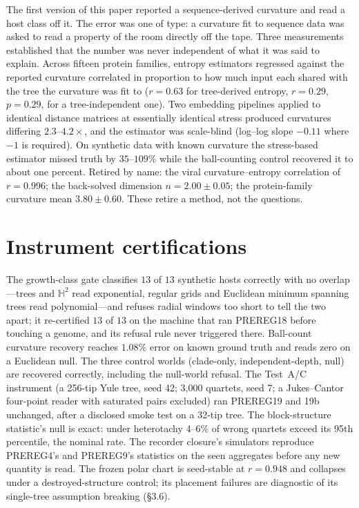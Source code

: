\documentclass[11pt]{article}
\newcommand{\Htwo}{\mathbb{H}^2}
\begin{document}
The first version of this paper reported a sequence-derived curvature and read a host class off it. The error was one of type: a curvature fit to sequence data was asked to read a property of the room directly off the tape. Three measurements established that the number was never independent of what it was said to explain. Across fifteen protein families, entropy estimators regressed against the reported curvature correlated in proportion to how much input each shared with the tree the curvature was fit to ($r=0.63$ for tree-derived entropy, $r=0.29$, $p=0.29$, for a tree-independent one). Two embedding pipelines applied to identical distance matrices at essentially identical stress produced curvatures differing $2.3$--$4.2\times$, and the estimator was scale-blind (log--log slope $-0.11$ where $-1$ is required). On synthetic data with known curvature the stress-based estimator missed truth by $35$--$109\%$ while the ball-counting control recovered it to about one percent. Retired by name: the viral curvature--entropy correlation of $r=0.996$; the back-solved dimension $n=2.00\pm0.05$; the protein-family curvature mean $3.80\pm0.60$. These retire a method, not the questions.

\section{Instrument certifications}

The growth-class gate classifies $13$ of $13$ synthetic hosts correctly with no overlap---trees and $\Htwo$ read exponential, regular grids and Euclidean minimum spanning trees read polynomial---and refuses radial windows too short to tell the two apart; it re-certified $13$ of $13$ on the machine that ran PREREG18 before touching a genome, and its refusal rule never triggered there. Ball-count curvature recovery reaches $1.08\%$ error on known ground truth and reads zero on a Euclidean null. The three control worlds (clade-only, independent-depth, null) are recovered correctly, including the null-world refusal. The Test~A/C instrument (a 256-tip Yule tree, seed 42; 3,000 quartets, seed 7; a Jukes--Cantor four-point reader with saturated pairs excluded) ran PREREG19 and 19b unchanged, after a disclosed smoke test on a 32-tip tree. The block-structure statistic's null is exact: under heterotachy 4--6\% of wrong quartets exceed its 95th percentile, the nominal rate. The recorder closure's simulators reproduce PREREG4's and PREREG9's statistics on the seen aggregates before any new quantity is read. The frozen polar chart is seed-stable at $r=0.948$ and collapses under a destroyed-structure control; its placement failures are diagnostic of its single-tree assumption breaking (\S3.6).
\end{document}
